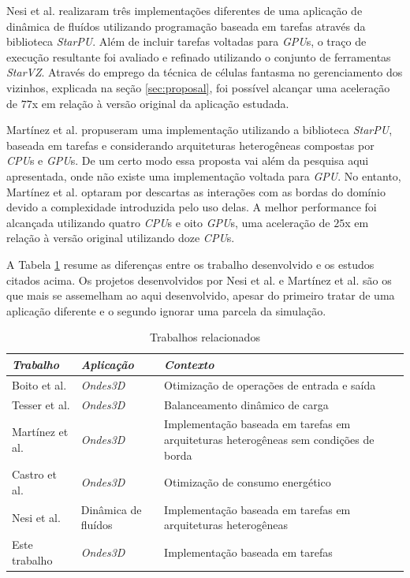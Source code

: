 \documentclass[cic,tc]{iiufrgs}
\begin{document}
Nesi et al. \cite{nesi} realizaram três implementações diferentes de uma aplicação de dinâmica de fluídos utilizando programação baseada em tarefas através da biblioteca \textit{StarPU}.
Além de incluir tarefas voltadas para \textit{GPU}s, o traço de execução resultante foi avaliado e refinado utilizando o conjunto de ferramentas \textit{StarVZ}. Através do emprego da técnica de
células fantasma no gerenciamento dos vizinhos, explicada na seção \ref{sec:proposal}, foi possível alcançar uma aceleração de $77$x em relação à versão original da aplicação estudada.

Martínez et al. \cite{victor} propuseram uma implementação utilizando a biblioteca \textit{StarPU}, baseada em tarefas e considerando arquiteturas heterogêneas compostas por
\textit{CPU}s e \textit{GPU}s. De um certo modo essa proposta vai além da pesquisa aqui apresentada, onde não existe uma implementação voltada para \textit{GPU}. No entanto, Martínez et al.
optaram por descartas as interações com as bordas do domínio devido a complexidade introduzida pelo uso delas. A melhor performance foi alcançada utilizando quatro \textit{CPU}s e oito
\textit{GPU}s, uma aceleração de $25$x em relação à versão original utilizando doze \textit{CPU}s.

A Tabela \ref{tbl:related_works} resume as diferenças entre os trabalho desenvolvido e os estudos citados acima. Os projetos desenvolvidos por Nesi et al. e Martínez et al. são
os que mais se assemelham ao aqui desenvolvido, apesar do primeiro tratar de uma aplicação diferente e o segundo ignorar uma parcela da simulação.

\begin{table}[htb!]
    \caption{Trabalhos relacionados}
    \begin{center}
        \begin{tabular}{l|l|p{60mm}}
            \textit{Trabalho} & \textit{Aplicação} & \textit{Contexto} \\
            \hline
            \hline
            Boito et al.    & \textit{Ondes3D} & Otimização de operações de entrada e saída \\
            Tesser et al.   & \textit{Ondes3D} & Balanceamento dinâmico de carga             \\
            Martínez et al. & \textit{Ondes3D} & Implementação baseada em tarefas em arquiteturas heterogêneas sem condições de borda             \\
            Castro et al.   & \textit{Ondes3D} & Otimização de consumo energético             \\
            Nesi et al.     & Dinâmica de fluídos & Implementação baseada em tarefas em arquiteturas heterogêneas \\
            Este trabalho   & \textit{Ondes3D} & Implementação baseada em tarefas             \\
            \hline
        \end{tabular}
    \end{center}
    \label{tbl:related_works}
\end{table}
\end{document}

